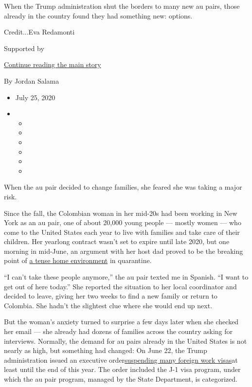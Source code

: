 When the Trump administration shut the borders to many new au pairs,
those already in the country found they had something new: options.

Credit...Eva Redamonti

Supported by

\protect\hyperlink{after-sponsor}{Continue reading the main story}

By Jordan Salama

\begin{itemize}
\item
  July 25, 2020
\item
  \begin{itemize}
  \item
  \item
  \item
  \item
  \item
  \item
  \end{itemize}
\end{itemize}

When the au pair decided to change families, she feared she was taking a
major risk.

Since the fall, the Colombian woman in her mid-20s had been working in
New York as an au pair, one of about 20,000 young people --- mostly
women --- who come to the United States each year to live with families
and take care of their children. Her yearlong contract wasn't set to
expire until late 2020, but one morning in mid-June, an argument with
her host dad proved to be the breaking point of
\href{https://www.nytimes.com/2020/07/17/style/this-is-not-the-america-these-au-pairs-were-expecting.html}{a
tense home environment} in quarantine.

``I can't take these people anymore,'' the au pair texted me in Spanish.
``I want to get out of here today.'' She reported the situation to her
local coordinator and decided to leave, giving her two weeks to find a
new family or return to Colombia. She hadn't the slightest clue where
she would end up next.

But the woman's anxiety turned to surprise a few days later when she
checked her email --- she already had dozens of families across the
country asking for interviews. Normally, the demand for au pairs already
in the United States is not nearly as high, but something had changed:
On June 22, the Trump administration issued an executive
order\href{https://www.nytimes.com/2020/06/19/us/foreign-worker-visas-trump-coronavirus.html}{suspending
many foreign work visas}at least until the end of this year. The order
included the J-1 visa program, under which the au pair program, managed
by the State Department, is categorized.

